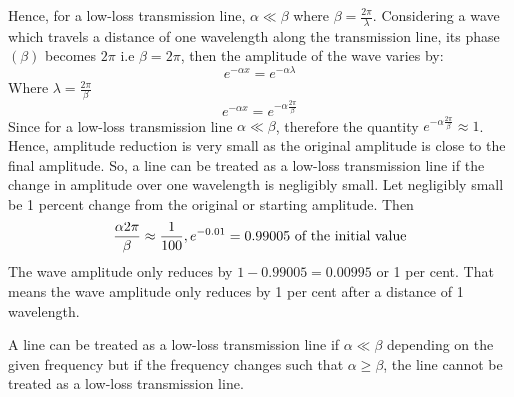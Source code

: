 Hence, for a low-loss transmission line, $\alpha \ll \beta$ where $\beta = \frac{2 \pi}{\lambda}$.
Considering a wave which travels a distance of one wavelength along the transmission line, its phase $(\beta)$ becomes $2\pi$ i.e $\beta = 2 \pi$, then the amplitude of the wave varies by:
\begin{equation*}
e^{-\alpha x} = e^{-\alpha \lambda}	
\end{equation*}
Where $\lambda = \frac{2 \pi}{\beta}$
\begin{equation*}
e^{- \alpha x} = e^{-\alpha \frac{2 \pi}{\beta}}
\end{equation*}
Since for a low-loss transmission line $\alpha\ll\beta$, therefore the quantity $e^{-\alpha \frac{2 \pi}{\beta}} \approx 1$. Hence, amplitude reduction is very small as the original amplitude is close to the final amplitude. So, a line can be treated as a low-loss transmission line if the change in amplitude over one wavelength is negligibly small. Let negligibly small be 1 percent change from the original or starting amplitude. Then
\[\frac{\alpha 2 \pi}{\beta} \approx \frac{1}{100}, e^{-0.01} = 0.99005\textnormal{ of the initial value}\]
The wave amplitude only reduces by $1-0.99005=0.00995$ or 1 per cent. That means the wave amplitude only reduces by 1 per cent after a distance of 1 wavelength.

A line can be treated as a low-loss transmission line if $\alpha \ll \beta$ depending on the given frequency but if the frequency changes such that $\alpha \geq \beta$, the line cannot be treated as a low-loss transmission line.

